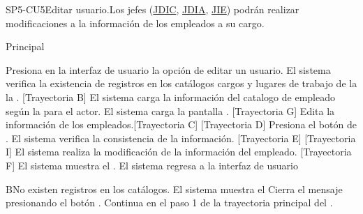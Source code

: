 \begin{UseCase}{SP5-CU5}{Editar usuario.}{Los jefes (\hyperlink{JDIC}{JDIC}, \hyperlink{JDIA}{JDIA}, \hyperlink{JIE}{JIE}) podrán realizar modificaciones a la información de los empleados a su cargo.}
{\begin{itemize}
            \end{itemize}
        }

\end{UseCase}

\begin{UCtrayectoria}{Principal}
    
    \UCpaso[\UCactor] Presiona en la interfaz de usuario  la opción de editar un usuario. 
    \UCpaso  El sistema verifica la existencia de registros en los catálogos cargos  y  lugares de trabajo de la la  . [Trayectoria B] 
    \UCpaso El sistema carga la información del catalogo de empleado  según la  para el actor.
    \UCpaso El sistema carga la pantalla  . [Trayectoria G] 
    \UCpaso[\UCactor] Edita la información de los empleados.[Trayectoria C] [Trayectoria D]
    \UCpaso[\UCactor]  Presiona el botón de .
    \UCpaso El sistema verifica la consistencia de la información. [Trayectoria E] [Trayectoria I]
    \UCpaso El sistema realiza la modificación de la información del empleado. [Trayectoria F] 
    \UCpaso  El sistema muestra el .    
    \UCpaso El sistema regresa a la interfaz de usuario 
\end{UCtrayectoria}

\begin{UCtrayectoriaA}{B}{No existen registros en los catálogos.}
    \UCpaso     El sistema muestra el 
    \UCpaso[\UCactor] Cierra el mensaje presionando el botón .
    \UCpaso Continua en el paso 1 de la trayectoria principal del .
\end{UCtrayectoriaA}


